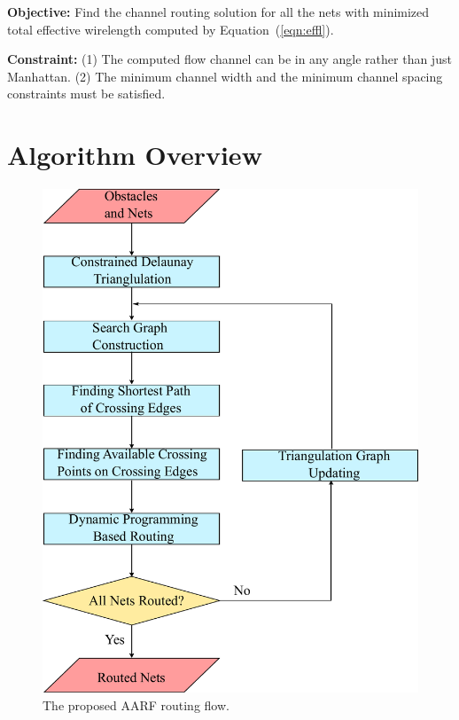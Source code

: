 \documentclass[journal]{IEEEtran}
\begin{document}
\textbf{Objective:}
Find the channel routing solution for all the nets with minimized total effective wirelength computed by Equation~(\ref{eqn:effl}).

\textbf{Constraint:}
(1) The computed flow channel can be in any angle rather than just Manhattan. (2) The minimum channel width and the minimum channel spacing constraints must be satisfied.

\section{Algorithm Overview}
\label{sec:overview}

\begin{figure}
\label{fig:overview}
\centering
\includegraphics[width=0.9\columnwidth, angle=0]{./Figs/newFlowOpt.pdf}
\vspace{-0.2cm}
\caption{The proposed AARF routing flow.}
\label{fig:overview}
\end{figure}
\end{document}
